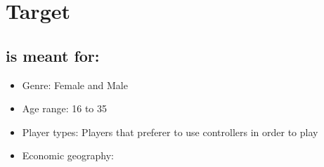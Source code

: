 %
%
%

\section{\projectname Target}

\subsection{\projectname is meant for:}
\begin{itemize}
\item Genre: Female and Male
\item Age range: 16 to 35
\item Player types: Players that preferer to use controllers in order to play
\item Economic geography:
\end{itemize}


